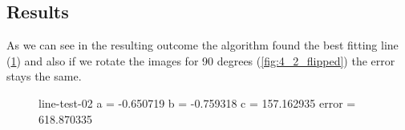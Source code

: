 \subsection{Results}
As we can see in the resulting outcome the algorithm found the best fitting line (\ref{fig:4_2}) and also if we rotate the images for 90 degrees (\ref{fig:4_2_flipped}) the error stays the same.

\begin{figure}
	\centering
	\begin{minipage}[t]{0.32\linewidth}
		\centering
		\caption{line-test-02 \break a = -0.650719 \break b = -0.759318 \break c = 157.162935 \break error = 618.870335}
		\label{fig:4_2}
	\end{minipage}
	\hfill
	\begin{minipage}[t]{0.32\linewidth}
		\centering

\end{minipage}
\end{figure}
